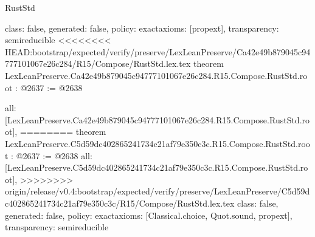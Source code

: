 \begin{lexlean}{RustStd}
\begin{coremodule}
{\begin{coremodule}
{{{{  class: false,
  generated: false,
  policy: exact{axioms: [propext]},
  transparency: semireducible
}
<<<<<<<< HEAD:bootstrap/expected/verify/preserve/LexLeanPreserve/Ca42e49b879045c94777101067e26c284/R15/Compose/RustStd.lex.tex
theorem LexLeanPreserve.Ca42e49b879045c94777101067e26c284.R15.Compose.RustStd.root : @2637 := @2638 {
  all: [LexLeanPreserve.Ca42e49b879045c94777101067e26c284.R15.Compose.RustStd.root],
========
theorem LexLeanPreserve.C5d59dc402865241734c21af79e350c3c.R15.Compose.RustStd.root : @2637 := @2638 {
  all: [LexLeanPreserve.C5d59dc402865241734c21af79e350c3c.R15.Compose.RustStd.root],
>>>>>>>> origin/release/v0.4:bootstrap/expected/verify/preserve/LexLeanPreserve/C5d59dc402865241734c21af79e350c3c/R15/Compose/RustStd.lex.tex
  class: false,
  generated: false,
  policy: exact{axioms: [Classical.choice, Quot.sound, propext]},
  transparency: semireducible
}

}}}}
\end{coremodule}}
\end{coremodule}
\end{lexlean}
